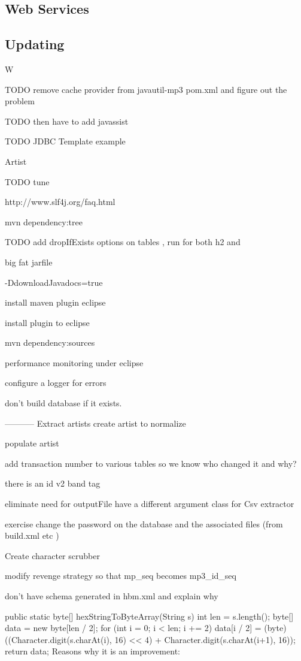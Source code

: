 \documentclass[a4paper,10pt]{book}
\begin{document}
\subsection{Web Services}

\subsection{Updating}

W


TODO remove cache provider from javautil-mp3 pom.xml and figure out the problem

TODO then have to add javassist

TODO JDBC Template example

Artist

TODO tune 

http://www.slf4j.org/faq.html

mvn dependency:tree

TODO
add dropIfExists options on tables , run for both h2 and

big fat jarfile

-DdownloadJavadocs=true

install maven plugin eclipse

install plugin to eclipse

mvn dependency:sources

performance monitoring under eclipse

configure a logger for errors

don't build database if it exists.

-----------
Extract artists
create artist to normalize

populate artist

add transaction number to various tables so we know who changed it and  why?

there is an id v2 band tag

eliminate need for outputFile have a different argument class for Csv extractor

exercise change the password on the database and the associated files (from build.xml etc )

Create character scrubber 

modify revenge strategy so that mp_seq becomes mp3_id_seq

don't have schema generated in hbm.xml and explain why

public static byte[] hexStringToByteArray(String s) {
    int len = s.length();
    byte[] data = new byte[len / 2];
    for (int i = 0; i < len; i += 2) {
        data[i / 2] = (byte) ((Character.digit(s.charAt(i), 16) << 4)
                             + Character.digit(s.charAt(i+1), 16));
    }
    return data;
}
Reasons why it is an improvement:
\end{document}
